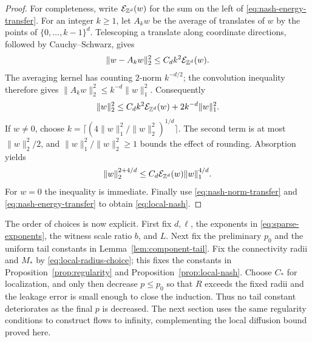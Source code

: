 \begin{proof}
For completeness, write \(\mathcal E_{\mathbb Z^d}(w)\) for the sum on
the left of \eqref{eq:nash-energy-transfer}.  For an integer
\(k\ge1\), let \(A_kw\) be the average of translates of \(w\)
by the points of \(\{0,\ldots,k-1\}^d\).  Telescoping a translate
along coordinate directions, followed by Cauchy--Schwarz, gives
\[
 \|w-A_kw\|_2^2\le C_d k^2\mathcal E_{\mathbb Z^d}(w).
\]
The averaging kernel has counting \(2\)-norm \(k^{-d/2}\);
the convolution inequality therefore gives
\(\|A_kw\|_2^2\le k^{-d}\|w\|_1^2\).  Consequently
\[
 \|w\|_2^2\le C_d k^2\mathcal E_{\mathbb Z^d}(w)
                 +2k^{-d}\|w\|_1^2.
\]
If \(w\ne0\), choose
\(k=\lceil(4\|w\|_1^2/\|w\|_2^2)^{1/d}\rceil\).
The second term is at most \(\|w\|_2^2/2\), and
\(\|w\|_1^2/\|w\|_2^2\ge1\) bounds the effect of rounding.
Absorption yields
\[
 \|w\|_2^{2+4/d}
 \le C_d\mathcal E_{\mathbb Z^d}(w)\|w\|_1^{4/d}.
\]
For \(w=0\) the inequality is immediate.  Finally use
\eqref{eq:nash-norm-transfer} and \eqref{eq:nash-energy-transfer}
to obtain \eqref{eq:local-nash}.
\end{proof}

The order of choices is now explicit.  First fix \(d,\ell\), the
exponents in \eqref{eq:sparse-exponents}, the witness scale ratio
\(b\), and \(L\).  Next fix the preliminary \(p_0\) and the uniform
tail constants in Lemma~\ref{lem:component-tail}.  Fix the connectivity
radii and \(M_*\) by \eqref{eq:local-radius-choice}; this fixes the
constants in Proposition~\ref{prop:regularity} and
Proposition~\ref{prop:local-nash}.  Choose \(C_*\) for localization,
and only then decrease \(p\le p_0\) so that \(R\) exceeds the fixed
radii and the leakage error is small enough to close the induction.
Thus no tail constant deteriorates as the final \(p\) is decreased.
The next section uses the same regularity conditions to construct
flows to infinity, complementing the local diffusion bound proved here.
